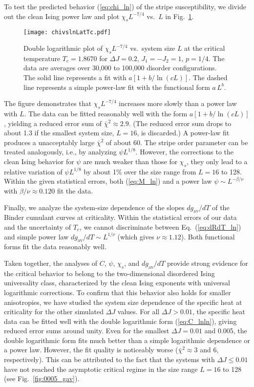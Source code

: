 \documentclass[twocolumn,showpacs,superscriptaddress,aps,prb]{revtex4-2}
\begin{document}
To test the predicted behavior (\ref{eq:chi_ln}) of the stripe susceptibility, we divide out the clean
Ising power law and plot $\chi_s L^{-7/4}$ vs.\ $L$ in Fig.\ \ref{fig:chi}.
\begin{figure}
\texttt{[image: chivslnLatTc.pdf]}
\caption{Double logarithmic plot of $\chi_s L^{-7/4}$ vs.\ system size $L$ at the critical temperature $T_c=1.8670$ for
$\Delta J =0.2$, $J_1=-J_2=1$, $p=1/4$. The data are averages over 30,000 to 100,000 disorder
configurations. The solid line represents a fit with $a[1+b/\ln(cL)]$. The dashed line represents a
simple power-law fit with the functional form $a\, L^b$.}
\label{fig:chi}
\end{figure}
The figure demonstrates that
$\chi_s L^{-7/4}$ increases more slowly than a power law with $L$. The data can be fitted reasonably well
with the form $a[1+b/\ln(cL)]$, yielding a reduced error sum of $\bar \chi^2 \approx 2.9$. (The reduced error sum
drops to about 1.3 if the smallest system size, $L=16$, is discarded.) A power-law fit
produces a unacceptably large $\bar \chi^2$ of about 60. The stripe order parameter can be treated
analogously, i.e., by analyzing $\psi L^{1/8}$. However, the corrections to the clean Ising behavior
for $\psi$ are much weaker than those for $\chi_s$, they only lead to a relative variation of $\psi L^{1/8}$
by about 1\% over the size range from $L=16$ to 128. Within the given statistical errors, both (\ref{eq:M_ln})
and a power law $\psi \sim L^{-\beta/\nu}$ with $\beta/\nu \approx 0.120$ fit the data.

Finally, we analyze the system-size dependence of the slopes $dg_\mathrm{av}/dT$ of the Binder cumulant
curves at criticality.
Within the statistical errors of our data and the uncertainty of $T_c$, we cannot discriminate
between Eq.\ (\ref{eq:dRdT_ln}) and simple power law $dg_\mathrm{av}/dT \sim L^{1/\nu}$
(which gives $\nu \approx 1.12$). Both functional forms fit the data reasonably well.

Taken together, the analyses of  $C$, $\psi$, $\chi_s$, and $dg_\mathrm{av}/dT$ provide strong evidence
for the critical behavior to belong to the two-dimensional disordered Ising universality class,
characterized by the clean Ising exponents with universal logarithmic corrections. To confirm that this behavior
also holds for smaller anisotropies, we have studied the system size dependence of the specific heat at criticality
for the other simulated $\Delta J$ values. For all $\Delta J > 0.01$, the specific heat data can be fitted well
with the double logarithmic form (\ref{eq:C_lnln}), giving  reduced error sums around unity. Even for the smallest
$\Delta J = 0.01$ and 0.005, the double logarithmic form fits much better than a simple logarithmic dependence or a power law.
However, the fit quality is noticeably worse ($\bar \chi^2 \approx 3$ and 6, respectively). This can be attributed to the fact that
the systems with $\Delta J \le 0.01$
have not reached the asymptotic critical regime in the size range $L=16$ to 128 (see Fig.\ \ref{fig:0005_gav}).
\end{document}
